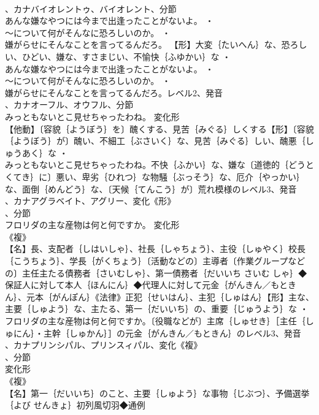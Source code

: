 \documentclass[8pt]{extreport}
\begin{document}
\begin{CJK}{UTF8}{min}
\\	、カナバイオレントゥ、バイオレント、分節
\\	あんな嫌なやつには今まで出逢ったことがないよ。 ・
\\	～について何がそんなに恐ろしいのか。 ・
\\	嫌がらせにそんなことを言ってるんだろ。		【形】大変｛たいへん｝な、恐ろしい、ひどい、嫌な、すさまじい、不愉快｛ふゆかい｝な ・
\\	あんな嫌なやつには今まで出逢ったことがないよ。 ・
\\	～について何がそんなに恐ろしいのか。 ・
\\	嫌がらせにそんなことを言ってるんだろ。レベル2、発音
\\	、カナオーフル、オウフル、分節
\\	みっともないとこ見せちゃったわね。	変化形 
\\	【他動】〔容貌｛ようぼう｝を〕醜くする、見苦｛みぐる｝しくする【形】〔容貌｛ようぼう｝が〕醜い、不細工｛ぶさいく｝な、見苦｛みぐる｝しい、醜悪｛しゅうあく｝な ・
\\	みっともないとこ見せちゃったわね。不快｛ふかい｝な、嫌な〔道徳的｛どうとくてき｝に〕悪い、卑劣｛ひれつ｝な物騒｛ぶっそう｝な、厄介｛やっかい｝な、面倒｛めんどう｝な、〔天候｛てんこう｝が〕荒れ模様のレベル3、発音
\\	、カナアグラベイト、アグリー、変化《形》
\\	、分節
\\	フロリダの主な産物は何と何ですか。	変化形 
\\	《複》
\\	【名】長、支配者｛しはいしゃ｝、社長｛しゃちょう｝、主役｛しゅやく｝校長｛こうちょう｝、学長｛がくちょう｝〔活動などの〕主導者〔作業グループなどの〕主任主たる債務者｛さいむしゃ｝、第一債務者｛だいいち さいむ しゃ｝◆保証人に対して本人｛ほんにん｝◆代理人に対して元金｛がんきん／もときん｝、元本｛がんぽん｝《法律》正犯｛せいはん｝、主犯｛しゅはん｝【形】主な、主要｛しゅよう｝な、主たる、第一｛だいいち｝の、重要｛じゅうよう｝な ・
\\	フロリダの主な産物は何と何ですか。〔役職などが〕主席｛しゅせき｝［主任｛しゅにん｝・主幹｛しゅかん｝］の元金｛がんきん／もときん｝のレベル3、発音
\\	、カナプリンシパル、プリンスィパル、変化《複》
\\	、分節
\\	変化形 
\\	《複》
\\	【名】第一｛だいいち｝のこと、主要｛しゅよう｝な事物｛じぶつ｝、予備選挙｛よび せんきょ｝初列風切羽◆通例

\end{CJK}
\end{document}
